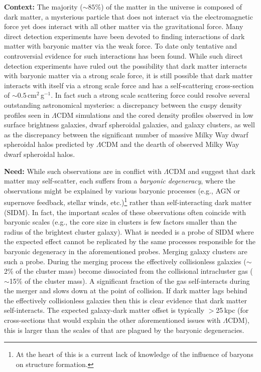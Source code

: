 
\noindent\textbf{Context:} 
The majority ($\sim85$\%) of the matter in the universe is composed of dark matter, a mysterious particle that does not interact via the electromagnetic force yet does interact with all other matter via the gravitational force.
Many direct detection experiments have been devoted to finding interactions of dark matter with baryonic matter via the weak force.
To date only tentative and controversial evidence for such interactions has been found.
While such direct detection experiments have ruled out the possibility that dark matter interacts with baryonic matter via a strong scale force, it is still possible that dark matter interacts with itself via a strong scale force and has a self-scattering cross-section of $\sim0.5$\,cm$^2$\,g$^{-1}$.
In fact such a strong scale scattering force could resolve several outstanding astronomical mysteries: a discrepancy between the cuspy density profiles seen in $\Lambda$CDM simulations and the cored density profiles observed in low surface brightness galaxies, dwarf spheroidal galaxies, and galaxy clusters, as well as the discrepancy between the significant number of massive Milky Way dwarf spheroidal halos predicted by $\Lambda$CDM and the dearth of observed Milky Way dwarf spheroidal halos.
 


\noindent\textbf{Need:} 
While such observations are in conflict with $\Lambda$CDM and suggest that dark matter may self-scatter, each suffers from a \emph{baryonic degeneracy}, where the observations might be explained by various baryonic processes (e.g., AGN or supernove feedback, stellar winds, etc.)\footnote{At the heart of this is a current lack of knowledge of the influence of baryons on structure formation.} rather than self-interacting dark matter (SIDM).
In fact, the important scales of these observations often coincide with baryonic scales (e.g., the core size in clusters is few factors smaller than the radius of the brightest cluster galaxy).
What is needed is a probe of SIDM where the expected effect cannot be replicated by the same processes responsible for the baryonic degeneracy in the aforementioned probes.
Merging galaxy clusters are such a probe.
During the merging process the effectively collisionless galaxies ($\sim$2\% of the cluster mass) become dissociated from the collisional intracluster gas ($\sim$15\% of the cluster mass).
A significant fraction of the gas self-interacts during the merger and slows down at the point of collision.
If dark matter lags behind the effectively collisionless galaxies then this is clear evidence that dark matter self-interacts.
The expected galaxy-dark matter offset is typically $>$25\,kpc (for cross-sections that would explain the other aforementioned issues with $\Lambda$CDM), this is larger than the scales of that are plagued by the baryonic degeneracies.


